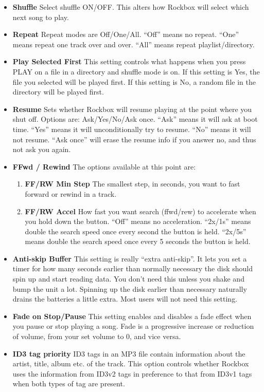 \begin{itemize}
\item \textbf{Shuffle}
  Select shuffle ON/OFF. This alters how Rockbox will select which next song to play.
\item \textbf{Repeat}
  Repeat modes are Off/One/All. ``Off'' means no repeat. ``One'' means repeat one track over and over. ``All'' means repeat playlist/directory. 
\item \textbf{Play Selected First}
  This setting controls what happens when you press PLAY on a file in a directory and shuffle mode is on. If this setting is Yes, the file you selected will be played first. If this setting is No, a random file in the directory will be played first.
\item \textbf{Resume}
  Sets whether Rockbox will resume playing at the point where you shut off. Options are: Ask/Yes/No/Ask once. ``Ask'' means it will ask at boot time. ``Yes'' means it will unconditionally try to resume. ``No'' means it will not resume. ``Ask once'' will erase the resume info if you answer no, and thus not ask you again.
\item \textbf{FFwd / Rewind}
  The options available at this point are:
  \begin{enumerate}
  \item \textbf{FF/RW Min Step}
    The smallest step, in seconds, you want to fast forward or rewind in a
    track.
  \item \textbf{FF/RW Accel}
    How fast you want search (ffwd/rew) to accelerate when you hold
    down the button. ``Off'' means no acceleration. ``2x/1s'' means double the
    search speed once every second the button is held. ``2x/5s'' means double the search speed once every 5 seconds the button is held.
  \end{enumerate}
  
\item \textbf{Anti{}-skip Buffer}
  This setting is really ``extra anti{}-skip''. It lets you set a timer for how many seconds earlier than normally necessary the disk should spin up and start reading data. You don't need this unless you shake and bump the unit a lot. Spinning up the disk earlier than necessary naturally drains the batteries a little extra. Most users will not need this setting.

\item \textbf{Fade on Stop/Pause}
  This setting enables and disables a fade effect when you pause or stop playing a song. Fade is a progressive increase or reduction of volume, from your set volume to 0, and vice versa.

\item \textbf{ID3 tag priority}
  ID3 tags in an MP3 file contain information about the artist, title, album etc. of the track.  This option controls whether Rockbox uses the information from ID3v2 tags in preference to that from ID3v1 tags when both types of tag are present.
\end{itemize}

